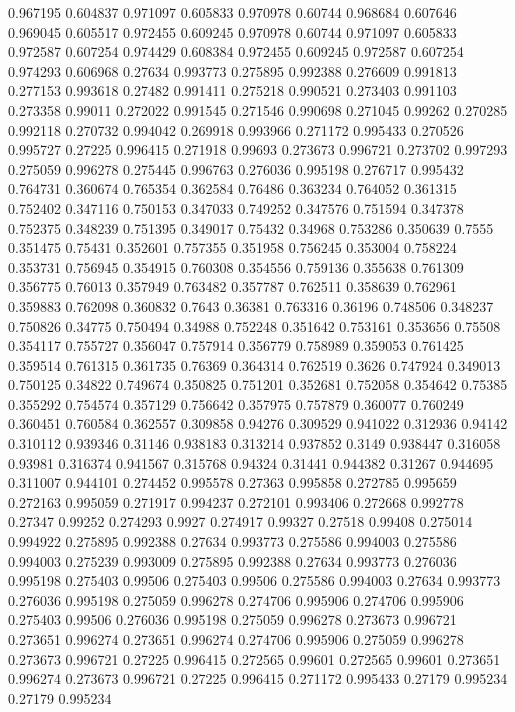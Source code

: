 0.967195 0.604837
0.971097 0.605833
0.970978 0.60744
0.968684 0.607646
0.969045 0.605517
0.972455 0.609245
0.970978 0.60744
0.971097 0.605833
0.972587 0.607254
0.974429 0.608384
0.972455 0.609245
0.972587 0.607254
0.974293 0.606968
0.27634 0.993773
0.275895 0.992388
0.276609 0.991813
0.277153 0.993618
0.27482 0.991411
0.275218 0.990521
0.273403 0.991103
0.273358 0.99011
0.272022 0.991545
0.271546 0.990698
0.271045 0.99262
0.270285 0.992118
0.270732 0.994042
0.269918 0.993966
0.271172 0.995433
0.270526 0.995727
0.27225 0.996415
0.271918 0.99693
0.273673 0.996721
0.273702 0.997293
0.275059 0.996278
0.275445 0.996763
0.276036 0.995198
0.276717 0.995432
0.764731 0.360674
0.765354 0.362584
0.76486 0.363234
0.764052 0.361315
0.752402 0.347116
0.750153 0.347033
0.749252 0.347576
0.751594 0.347378
0.752375 0.348239
0.751395 0.349017
0.75432 0.34968
0.753286 0.350639
0.7555 0.351475
0.75431 0.352601
0.757355 0.351958
0.756245 0.353004
0.758224 0.353731
0.756945 0.354915
0.760308 0.354556
0.759136 0.355638
0.761309 0.356775
0.76013 0.357949
0.763482 0.357787
0.762511 0.358639
0.762961 0.359883
0.762098 0.360832
0.7643 0.36381
0.763316 0.36196
0.748506 0.348237
0.750826 0.34775
0.750494 0.34988
0.752248 0.351642
0.753161 0.353656
0.75508 0.354117
0.755727 0.356047
0.757914 0.356779
0.758989 0.359053
0.761425 0.359514
0.761315 0.361735
0.76369 0.364314
0.762519 0.3626
0.747924 0.349013
0.750125 0.34822
0.749674 0.350825
0.751201 0.352681
0.752058 0.354642
0.75385 0.355292
0.754574 0.357129
0.756642 0.357975
0.757879 0.360077
0.760249 0.360451
0.760584 0.362557
0.309858 0.94276
0.309529 0.941022
0.312936 0.94142
0.310112 0.939346
0.31146 0.938183
0.313214 0.937852
0.3149 0.938447
0.316058 0.93981
0.316374 0.941567
0.315768 0.94324
0.31441 0.944382
0.31267 0.944695
0.311007 0.944101
0.274452 0.995578
0.27363 0.995858
0.272785 0.995659
0.272163 0.995059
0.271917 0.994237
0.272101 0.993406
0.272668 0.992778
0.27347 0.99252
0.274293 0.9927
0.274917 0.99327
0.27518 0.99408
0.275014 0.994922
0.275895 0.992388
0.27634 0.993773
0.275586 0.994003
0.275586 0.994003
0.275239 0.993009
0.275895 0.992388
0.27634 0.993773
0.276036 0.995198
0.275403 0.99506
0.275403 0.99506
0.275586 0.994003
0.27634 0.993773
0.276036 0.995198
0.275059 0.996278
0.274706 0.995906
0.274706 0.995906
0.275403 0.99506
0.276036 0.995198
0.275059 0.996278
0.273673 0.996721
0.273651 0.996274
0.273651 0.996274
0.274706 0.995906
0.275059 0.996278
0.273673 0.996721
0.27225 0.996415
0.272565 0.99601
0.272565 0.99601
0.273651 0.996274
0.273673 0.996721
0.27225 0.996415
0.271172 0.995433
0.27179 0.995234
0.27179 0.995234
